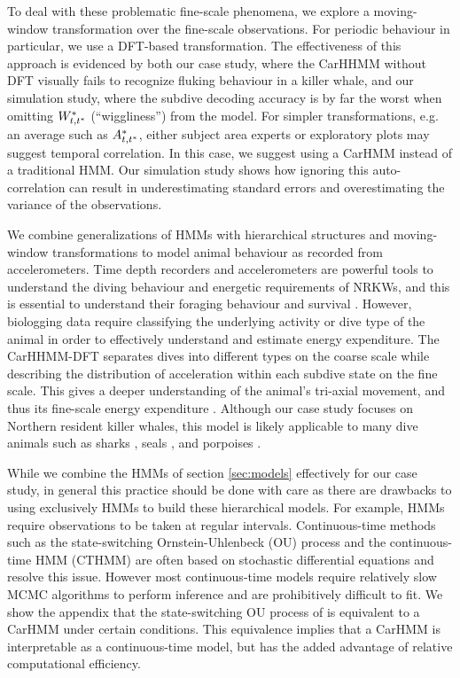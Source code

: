 To deal with these problematic fine-scale phenomena, we explore a moving-window transformation over the fine-scale observations. For periodic behaviour in particular, we use a DFT-based transformation. The effectiveness of this approach is evidenced by both our case study, where the CarHHMM without DFT visually fails to recognize fluking behaviour in a killer whale, and our simulation study, where the subdive decoding accuracy is by far the worst when omitting $W^*_{t,t^*}$ (``wiggliness'') from the model. For simpler transformations, e.g. an average such as $A^*_{t,t^*}$, either subject area experts or exploratory plots may suggest temporal correlation. In this case,  we suggest using a CarHMM instead of a traditional HMM. Our simulation study shows how ignoring this auto-correlation can result in underestimating standard errors and overestimating the variance of the observations. 

We combine generalizations of HMMs with hierarchical structures and moving-window transformations to model animal behaviour as recorded from accelerometers. Time depth recorders and accelerometers are powerful tools to understand the diving behaviour and energetic requirements of NRKWs, and this is essential to understand their foraging behaviour and survival \citep{Williams:2009,Noren:2011}. However, biologging data require classifying the underlying activity \citep{Dot:2016} or dive type \citep{Hastie:2006} of the animal in order to effectively understand and estimate energy expenditure. The CarHHMM-DFT separates dives into different types on the coarse scale while describing the distribution of acceleration within each subdive state on the fine scale. This gives a deeper understanding of the animal's tri-axial movement, and thus its fine-scale energy expenditure \citep{Gleiss:2011,Qasem:2012}. Although our case study focuses on Northern resident killer whales, this model is likely applicable to many dive animals such as sharks \citep{Adam:2019}, seals \citep{Dot:2016}, and porpoises \citep{Barajas:2017}.

While we combine the HMMs of section \ref{sec:models} effectively for our case study, in general this practice should be done with care as there are drawbacks to using exclusively HMMs to build these hierarchical models. For example, HMMs require observations to be taken at regular intervals. Continuous-time methods such as the state-switching Ornstein-Uhlenbeck (OU) process \citep{Michelot:2019} and the continuous-time HMM (CTHMM) \citep{Liu:2015} are often based on stochastic differential equations and resolve this issue. However most continuous-time models require relatively slow MCMC algorithms to perform inference and are prohibitively difficult to fit. We show the appendix that the state-switching OU process of \citet{Michelot:2019} is equivalent to a CarHMM under certain conditions. This equivalence implies that a CarHMM is interpretable as a continuous-time model, but has the added advantage of relative computational efficiency.

